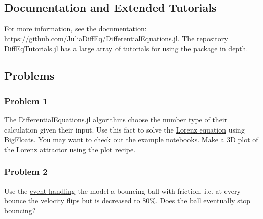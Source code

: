 \documentclass[11pt]{article}
\begin{document}
    \subsection{Documentation and Extended
Tutorials}\label{documentation-and-extended-tutorials}

For more information, see the documentation:
https://github.com/JuliaDiffEq/DifferentialEquations.jl. The repository
\href{https://github.com/JuliaDiffEq/DiffEqTutorials.jl}{DiffEqTutorials.jl}
has a large array of tutorials for using the package in depth.

    \subsection{Problems}\label{problems}

\subsubsection{Problem 1}\label{problem-1}

The DifferentialEquations.jl algorithms choose the number type of their
calculation given their input. Use this fact to solve the
\href{https://en.wikipedia.org/wiki/Lorenz_system}{Lorenz equation}
using BigFloats. You may want to
\href{https://github.com/JuliaDiffEq/DiffEqTutorials.jl}{check out the
example notebooks}. Make a 3D plot of the Lorenz attractor using the
plot recipe.

\subsubsection{Problem 2}\label{problem-2}

Use the
\href{http://docs.juliadiffeq.org/latest/features/callback_functions.html}{event
handling} the model a bouncing ball with friction, i.e. at every bounce
the velocity flips but is decreased to 80\%. Does the ball eventually
stop bouncing?


    
    
    
    
\end{document}
